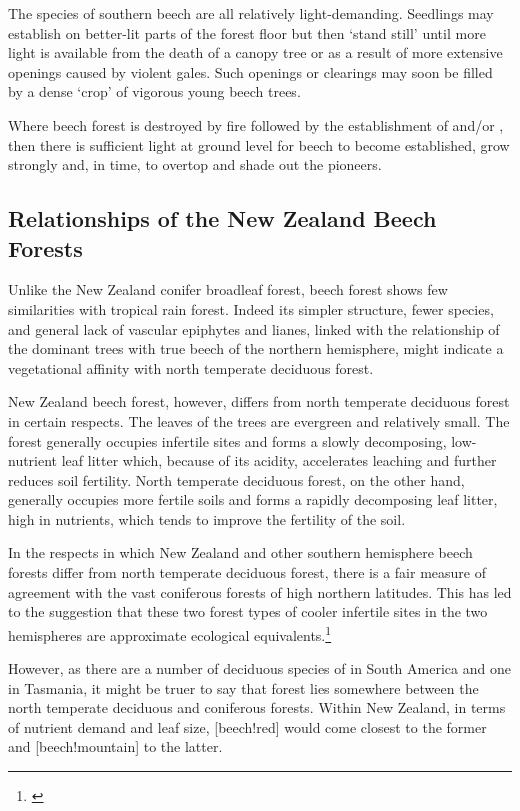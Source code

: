 The species of southern beech are all relatively light-demanding.
Seedlings may establish on better-lit parts of the forest floor but then `stand still' until more light is available from the death of a canopy tree or as a result of more extensive openings caused by violent gales.
Such openings or clearings may soon be filled by a dense `crop' of vigorous young beech trees.

Where beech forest is destroyed by fire followed by the establishment of  and/or , then there is sufficient light at ground level for beech to become established, grow strongly and, in time, to overtop and shade out the pioneers.

\subsection{Relationships of the New Zealand Beech Forests}

Unlike the New Zealand conifer broadleaf forest, beech forest shows few similarities with tropical rain forest.
Indeed its simpler structure, fewer species, and general lack of vascular epiphytes and lianes, linked with the relationship of the dominant trees with true beech of the northern hemisphere, might indicate a vegetational affinity with north temperate deciduous forest.

New Zealand beech forest, however, differs from north temperate deciduous forest in certain respects.
The leaves of the trees are evergreen and relatively small.
The forest generally occupies infertile sites and forms a slowly decomposing, low-nutrient leaf litter which, because of its acidity, accelerates leaching and further reduces soil fertility.
North temperate deciduous forest, on the other hand, generally occupies more fertile soils and forms a rapidly decomposing leaf litter, high in nutrients, which tends to improve the fertility of the soil.

In the respects in which New Zealand and other southern hemisphere beech forests differ from north temperate deciduous forest, there is a fair measure of agreement with the vast coniferous forests of high northern latitudes.
This has led to the suggestion that these two forest types of cooler infertile sites in the two hemispheres are approximate ecological equivalents.\footnote{\cite{dansereau1964six}}

However, as there are a number of deciduous species of  in South America and one in Tasmania, it might be truer to say that  forest lies somewhere between the north temperate deciduous and coniferous forests.
Within New Zealand, in terms of nutrient demand and leaf size, [beech!red] would come closest to the former and [beech!mountain] to the latter.
